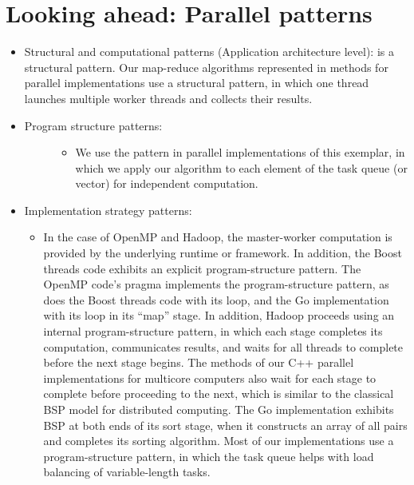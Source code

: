 \documentclass[letterpaper,10pt,openany,oneside]{sphinxmanual}
\begin{document}
\section{Looking ahead: Parallel patterns}
\label{evaluation/evaluation:looking-ahead-parallel-patterns}\begin{itemize}
\item {} 
Structural and computational patterns (Application architecture level):  is a structural pattern. Our map-reduce algorithms represented in  methods for parallel implementations use a  structural pattern, in which one thread launches multiple worker threads and collects their results.

\item {} \begin{description}
\item[{Program structure patterns:}] \leavevmode\begin{itemize}
\item {} 
We use the  pattern in parallel implementations of this exemplar, in which we apply our  algorithm to each element of the task queue (or vector) for independent computation.

\end{itemize}

\end{description}

\item {} 
Implementation strategy patterns:
\begin{itemize}
\item {} 
In the case of OpenMP and Hadoop, the master-worker computation is provided by the underlying runtime or framework. In addition, the Boost threads code exhibits an explicit  program-structure pattern. The OpenMP code’s  pragma implements the  program-structure pattern, as does the Boost threads code with its  loop, and the Go implementation with its  loop in its “map” stage. In addition, Hadoop proceeds using an internal  program-structure pattern, in which each stage completes its computation, communicates results, and waits for all threads to complete before the next stage begins. The  methods of our C++ parallel implementations for multicore computers also wait for each stage to complete before proceeding to the next, which is similar to the classical BSP model for distributed computing. The Go implementation exhibits BSP at both ends of its sort stage, when it constructs an array of all pairs and completes its sorting algorithm. Most of our implementations use a  program-structure pattern, in which the task queue helps with load balancing of variable-length tasks.


\end{itemize}
\end{itemize}
\end{document}
